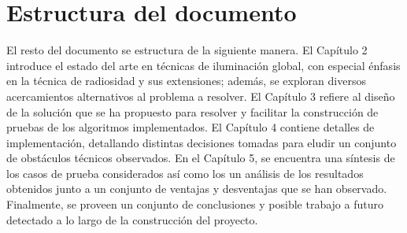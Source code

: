 
\section{Estructura del documento}
\label{sec:estructuraDelDocumento}

El resto del documento se estructura de la siguiente manera. El Capítulo 2 introduce el estado del arte en técnicas de iluminación global, con especial énfasis en la técnica de radiosidad y sus extensiones; además, se exploran diversos acercamientos alternativos al problema a resolver. El Capítulo 3 refiere al diseño de la solución que se ha propuesto para resolver y facilitar la construcción de pruebas de los algoritmos implementados. El Capítulo 4 contiene detalles de implementación, detallando distintas decisiones tomadas para eludir un conjunto de obstáculos técnicos observados. En el Capítulo 5, se encuentra una síntesis de los casos de prueba considerados así como los un análisis de los resultados obtenidos junto a un conjunto de ventajas y desventajas que se han observado. Finalmente, se proveen un conjunto de conclusiones y posible trabajo a futuro detectado a lo largo de la construcción del proyecto.
